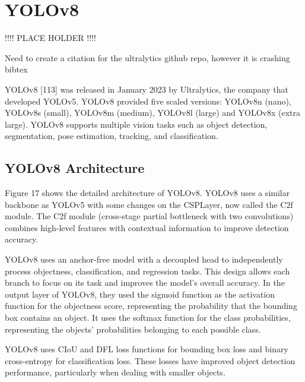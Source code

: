 \documentclass{article}
\begin{document}

\section{YOLOv8}

!!!! PLACE HOLDER !!!!

Need to create a citation for the ultralytics github repo, however it is crashing bibtex

YOLOv8 [113] was released in January 2023 by Ultralytics, the company that developed YOLOv5. YOLOv8 provided five scaled versions: YOLOv8n (nano), YOLOv8s (small), YOLOv8m (medium), YOLOv8l (large) and YOLOv8x (extra large). YOLOv8 supports multiple vision tasks such as object detection, segmentation, pose estimation, tracking, and classification.

\subsection{YOLOv8 Architecture}

Figure 17 shows the detailed architecture of YOLOv8. YOLOv8 uses a similar backbone as YOLOv5 with some changes on the CSPLayer, now called the C2f module. The C2f module (cross-stage partial bottleneck with two convolutions) combines high-level features with contextual information to improve detection accuracy.

YOLOv8 uses an anchor-free model with a decoupled head to independently process objectness, classification, and regression tasks. This design allows each branch to focus on its task and improves the model’s overall accuracy. In the output layer of YOLOv8, they used the sigmoid function as the activation function for the objectness score, representing the probability that the bounding box contains an object. It uses the softmax function for the class probabilities, representing the objects’ probabilities belonging to each possible class.

YOLOv8 uses CIoU \cite{zheng2020distance} and DFL \cite{li2020generalized} loss functions for bounding box loss and binary cross-entropy for classification loss. These losses have improved object detection performance, particularly when dealing with smaller objects.
\end{document}
